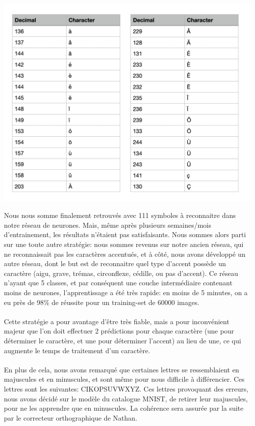 \documentclass{article}
\begin{document}
\begin{center}
	\includegraphics[scale=0.5]{tableauXAscii}
\end{center}

Nous nous somme finalement retrouvés avec 111 symboles à reconnaitre dans notre réseau de neurones.
Mais, même après plusieurs semaines/mois d’entrainement, les résultats n’étaient pas satisfaisants.
Nous sommes alors parti sur une toute autre stratégie: nous sommes revenus sur notre ancien réseau, qui ne reconnaissait pas les caractères accentués, et à côté, nous avons développé un autre réseau, dont le but est de reconnaitre quel type d’accent possède un caractère (aigu, grave, trémas, circonflexe, cédille, ou pas d’accent).
Ce réseau n’ayant que 5 classes, et par conséquent une couche intermédiaire contenant moins de neurones, l’apprentissage a été très rapide: en moins de 5 minutes, on a eu près de 98\% de réussite pour un training-set de 60000 images.

\paragraph{}Cette stratégie a pour avantage d’être très fiable, mais a pour inconvénient majeur que l’on doit effectuer 2 prédictions pour chaque caractère (une pour déterminer le caractère, et une pour déterminer l’accent) au lieu de une, ce qui augmente le temps de traitement d’un caractère.

\paragraph{}En plus de cela, nous avons remarqué que certaines lettres se ressemblaient en majuscules et en minuscules, et sont même pour nous difficile à différencier. Ces lettres sont les suivantes: CIKOPSUVWXYZ. Ces lettres provoquant des erreurs, nous avons décidé sur le modèle du catalogue MNIST, de retirer leur majuscules, pour ne les apprendre que en minuscules. La cohérence sera assurée par la suite par le correcteur orthographique de Nathan.
\end{document}
